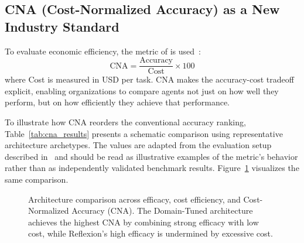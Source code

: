 \subsection{CNA (Cost-Normalized Accuracy) as a New Industry Standard}

To evaluate economic efficiency, the metric of  is used~\citep{beyond_accuracy}:
\begin{equation}
    \text{CNA} = \frac{\text{Accuracy}}{\text{Cost}} \times 100
\end{equation}
where Cost is measured in USD per task. CNA makes the accuracy-cost tradeoff explicit, enabling organizations to compare agents not just on how well they perform, but on how efficiently they achieve that performance.

To illustrate how CNA reorders the conventional accuracy ranking, Table~\ref{tab:cna_results} presents a schematic comparison using representative architecture archetypes. The values are adapted from the evaluation setup described in~\citet{beyond_accuracy} and should be read as illustrative examples of the metric's behavior rather than as independently validated benchmark results. Figure~\ref{fig:cna_comparison} visualizes the same comparison.

\begin{table}[htbp]
\centering
\caption{Illustrative architecture comparison: efficacy, cost, and CNA (schematic example adapted from~\citet{beyond_accuracy}; values are not original experimental results).}
\label{tab:cna_results}
\fontsize{6}{6.8}\selectfont
{}
\end{table}

\begin{figure}[htbp]
\centering

\caption{Architecture comparison across efficacy, cost efficiency, and Cost-Normalized Accuracy (CNA). The Domain-Tuned architecture achieves the highest CNA by combining strong efficacy with low cost, while Reflexion's high efficacy is undermined by excessive cost.}
\label{fig:cna_comparison}
\end{figure}

